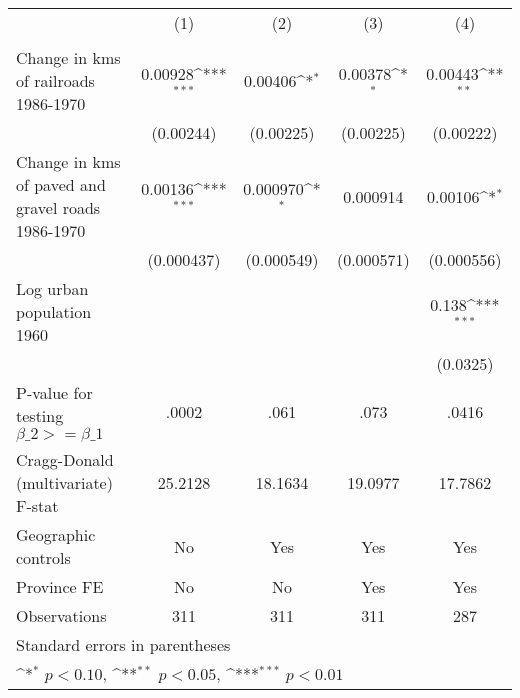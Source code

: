 {
\def\sym#1{\ifmmode^{#1}\else\(^{#1}\)\fi}
\begin{tabular}{l*{4}{c}}
\hline\hline
                &\multicolumn{1}{c}{(1)}&\multicolumn{1}{c}{(2)}&\multicolumn{1}{c}{(3)}&\multicolumn{1}{c}{(4)}\\
                &\multicolumn{1}{c}{}&\multicolumn{1}{c}{}&\multicolumn{1}{c}{}&\multicolumn{1}{c}{}\\
\hline
Change in kms of railroads 1986-1970&  0.00928\sym{***}&  0.00406\sym{*}  &  0.00378\sym{*}  &  0.00443\sym{**} \\
                &(0.00244)         &(0.00225)         &(0.00225)         &(0.00222)         \\
[1em]
Change in kms of paved and gravel roads 1986-1970&  0.00136\sym{***}& 0.000970\sym{*}  & 0.000914         &  0.00106\sym{*}  \\
                &(0.000437)         &(0.000549)         &(0.000571)         &(0.000556)         \\
[1em]
Log urban population 1960&                  &                  &                  &    0.138\sym{***}\\
                &                  &                  &                  & (0.0325)         \\
\hline
P-value for testing $\beta\_{2} >= \beta\_{1}$&    .0002         &     .061         &     .073         &    .0416         \\
Cragg-Donald (multivariate) F-stat&  25.2128         &  18.1634         &  19.0977         &  17.7862         \\
Geographic controls&       No         &      Yes         &      Yes         &      Yes         \\
Province FE     &       No         &       No         &      Yes         &      Yes         \\
Observations    &      311         &      311         &      311         &      287         \\
\hline\hline
\multicolumn{5}{l}{\footnotesize Standard errors in parentheses}\\
\multicolumn{5}{l}{\footnotesize \sym{*} \(p<0.10\), \sym{**} \(p<0.05\), \sym{***} \(p<0.01\)}\\
\end{tabular}
}
